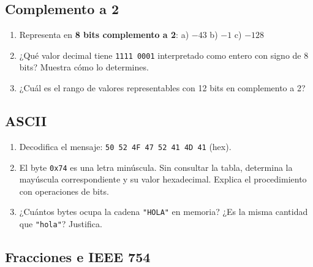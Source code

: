 \documentclass[12pt, oneside]{article}
\begin{document}
\subsection{Complemento a 2}

\begin{enumerate}[resume]
  \item Representa en \textbf{8 bits complemento a 2}: \quad a) $-43$ \quad b) $-1$ \quad c) $-128$
  \item ¿Qué valor decimal tiene \texttt{1111 0001} interpretado como
        entero con signo de 8 bits? Muestra cómo lo determines.
  \item ¿Cuál es el rango de valores representables con 12 bits en complemento a 2?
\end{enumerate}

\subsection{ASCII}

\begin{enumerate}[resume]
  \item Decodifica el mensaje: \texttt{50 52 4F 47 52 41 4D 41} (hex).
  \item El byte \texttt{0x74} es una letra minúscula.  Sin consultar la tabla,
        determina la mayúscula correspondiente y su valor hexadecimal.
        Explica el procedimiento con operaciones de bits.
  \item ¿Cuántos bytes ocupa la cadena \texttt{"HOLA"} en memoria?
        ¿Es la misma cantidad que \texttt{"hola"}? Justifica.
\end{enumerate}

\subsection{Fracciones e IEEE 754}
\end{document}
